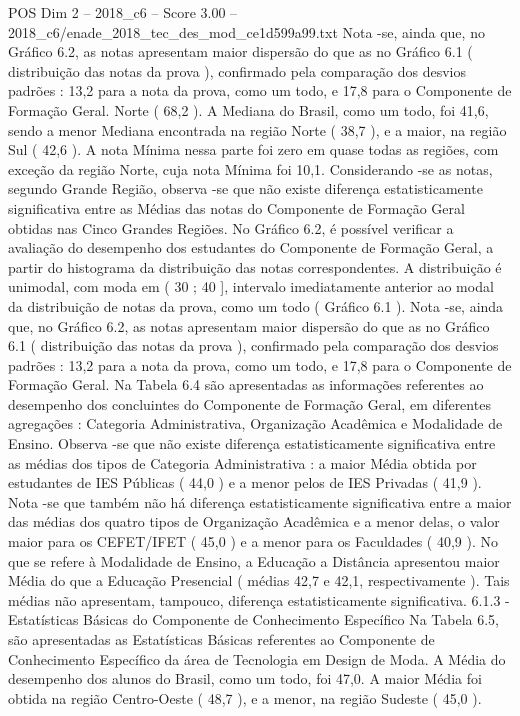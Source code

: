\begin{textsample}{POS Dim 2 – 2018\_c6 – Score 3.00 – 2018\_c6/enade\_2018\_tec\_des\_mod\_ce1d599a99.txt}
Nota -se, ainda que, no Gráfico 6.2, as notas apresentam maior dispersão do que as no Gráfico 6.1 ( distribuição das notas da prova ), confirmado pela comparação dos desvios padrões : 13,2 para a nota da prova, como um todo, e 17,8 para o Componente de Formação Geral.
Norte ( 68,2 ).
A Mediana do Brasil, como um todo, foi 41,6, sendo a menor Mediana encontrada na região Norte ( 38,7 ), e a maior, na região Sul ( 42,6 ).
A nota Mínima nessa parte foi zero em quase todas as regiões, com exceção da região Norte, cuja nota Mínima foi 10,1.
Considerando -se as notas, segundo Grande Região, observa -se que não existe diferença estatisticamente significativa entre as Médias das notas do Componente de Formação Geral obtidas nas Cinco Grandes Regiões.
No Gráfico 6.2, é possível verificar a avaliação do desempenho dos estudantes do Componente de Formação Geral, a partir do histograma da distribuição das notas correspondentes.
A distribuição é unimodal, com moda em ( 30 ; 40 ], intervalo imediatamente anterior ao modal da distribuição de notas da prova, como um todo ( Gráfico 6.1 ).
Nota -se, ainda que, no Gráfico 6.2, as notas apresentam maior dispersão do que as no Gráfico 6.1 ( distribuição das notas da prova ), confirmado pela comparação dos desvios padrões : 13,2 para a nota da prova, como um todo, e 17,8 para o Componente de Formação Geral.
Na Tabela 6.4 são apresentadas as informações referentes ao desempenho dos concluintes do Componente de Formação Geral, em diferentes agregações : Categoria Administrativa, Organização Acadêmica e Modalidade de Ensino.
Observa -se que não existe diferença estatisticamente significativa entre as médias dos tipos de Categoria Administrativa : a maior Média obtida por estudantes de IES Públicas ( 44,0 ) e a menor pelos de IES Privadas ( 41,9 ).
Nota -se que também não há diferença estatisticamente significativa entre a maior das médias dos quatro tipos de Organização Acadêmica e a menor delas, o valor maior para os CEFET/IFET ( 45,0 ) e a menor para os Faculdades ( 40,9 ).
No que se refere à Modalidade de Ensino, a Educação a Distância apresentou maior Média do que a Educação Presencial ( médias 42,7 e 42,1, respectivamente ).
Tais médias não apresentam, tampouco, diferença estatisticamente significativa. 6.1.3 - Estatísticas Básicas do Componente de Conhecimento Específico Na Tabela 6.5, são apresentadas as Estatísticas Básicas referentes ao Componente de Conhecimento Específico da área de Tecnologia em Design de Moda.
A Média do desempenho dos alunos do Brasil, como um todo, foi 47,0.
A maior Média foi obtida na região Centro-Oeste ( 48,7 ), e a menor, na região Sudeste ( 45,0 ).

\end{textsample}
